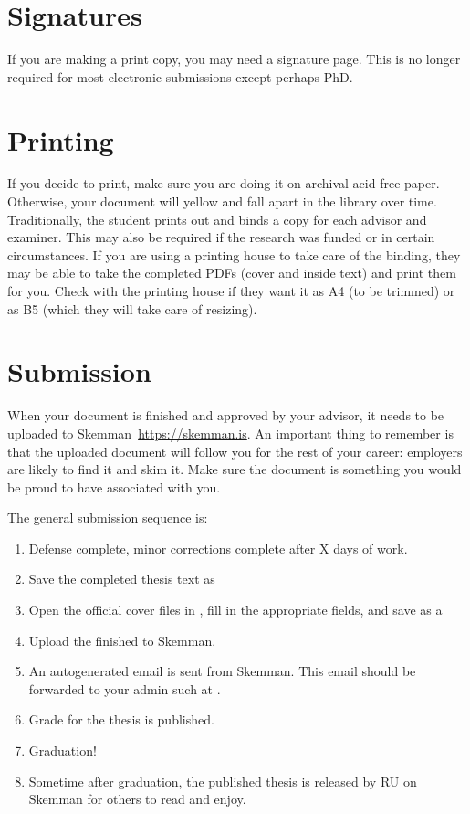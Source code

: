 \section{Signatures}
If you are making a print copy, you may need a signature page.
This is no longer required for most electronic submissions except perhaps PhD.

\section{Printing}
If you decide to print, make sure you are doing it on archival acid-free paper.
Otherwise, your document will yellow and fall apart in the library over time.
Traditionally, the student prints out and binds a copy for each advisor and examiner.
This may also be required if the research was funded or in certain circumstances.
If you are using a printing house to take care of the binding, they may be able to take the completed PDFs (cover and inside text) and print them for you.
Check with the printing house if they want it as A4 (to be trimmed) or as B5 (which they will take care of resizing).

\section{Submission}
When your document is finished and approved by your advisor, it needs to be uploaded to Skemman~\url{https://skemman.is}.
An important thing to remember is that the uploaded document will follow you for the rest of your career:
employers are likely to find it and skim it.
Make sure the document is something you would be proud to have associated with you.

The general submission sequence is:
\begin{enumerate}
\item Defense complete, minor corrections complete after X days of work.
\item Save the completed thesis text as 
\item Open the official cover files in , fill in the appropriate fields, and save as a 
\item Upload the finished  to Skemman.
\item An autogenerated email is sent from Skemman.
  This email should be forwarded to your admin such at \TItvdadmin{}.
\item Grade for the thesis is published.
\item Graduation!
\item Sometime after graduation, the published thesis is released by RU on Skemman for others to read and enjoy.
\end{enumerate}

